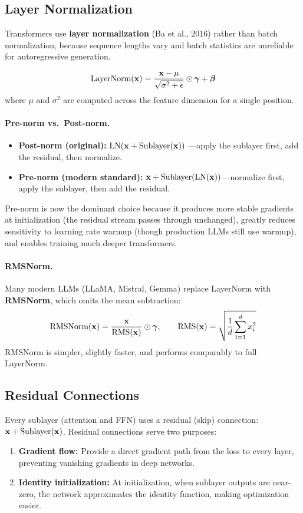 \subsection{Layer Normalization}

Transformers use \textbf{layer normalization} (Ba et al., 2016) rather than
batch normalization, because sequence lengths vary and batch statistics are
unreliable for autoregressive generation.

\[
    \text{LayerNorm}(\mathbf{x}) = \frac{\mathbf{x} - \mu}{\sqrt{\sigma^2 + \epsilon}} \odot \bm{\gamma} + \bm{\beta}
\]
where $\mu$ and $\sigma^2$ are computed across the feature dimension for a
single position.

\paragraph{Pre-norm vs.\ Post-norm.}
\begin{itemize}
    \item \textbf{Post-norm (original):} $\text{LN}(\mathbf{x} + \text{Sublayer}(\mathbf{x}))$
          ---apply the sublayer first, add the residual, then normalize.
    \item \textbf{Pre-norm (modern standard):}
          $\mathbf{x} + \text{Sublayer}(\text{LN}(\mathbf{x}))$---normalize first, apply
          the sublayer, then add the residual.
\end{itemize}

Pre-norm is now the dominant choice because it produces more stable gradients
at initialization (the residual stream passes through unchanged), greatly
reduces sensitivity to learning rate warmup (though production LLMs still
use warmup), and enables training much deeper transformers.

\paragraph{RMSNorm.}
Many modern LLMs (LLaMA, Mistral, Gemma) replace LayerNorm with
\textbf{RMSNorm}, which omits the mean subtraction:
\[
    \text{RMSNorm}(\mathbf{x}) = \frac{\mathbf{x}}{\text{RMS}(\mathbf{x})} \odot \bm{\gamma},
    \qquad
    \text{RMS}(\mathbf{x}) = \sqrt{\frac{1}{d}\sum_{i=1}^{d} x_i^2}
\]
RMSNorm is simpler, slightly faster, and performs comparably to full LayerNorm.

\subsection{Residual Connections}

Every sublayer (attention and FFN) uses a residual (skip) connection:
$\mathbf{x} + \text{Sublayer}(\mathbf{x})$.  Residual connections serve two purposes:
\begin{enumerate}
    \item \textbf{Gradient flow:} Provide a direct gradient path from the loss
          to every layer, preventing vanishing gradients in deep networks.
    \item \textbf{Identity initialization:} At initialization, when sublayer
          outputs are near-zero, the network approximates the identity function,
          making optimization easier.
\end{enumerate}

